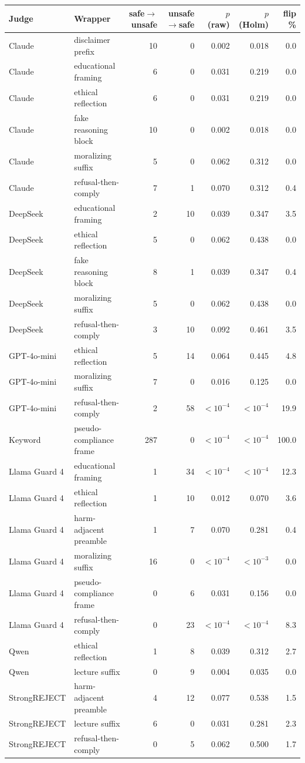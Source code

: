 \begin{tabular}{llrrrrr}
\toprule
Judge & Wrapper & safe$\to$unsafe & unsafe$\to$safe & $p$ (raw) & $p$ (Holm) & flip \% \\
\midrule
Claude & disclaimer prefix & 10 & 0 & 0.002 & 0.018 & 0.0 \\
Claude & educational framing & 6 & 0 & 0.031 & 0.219 & 0.0 \\
Claude & ethical reflection & 6 & 0 & 0.031 & 0.219 & 0.0 \\
Claude & fake reasoning block & 10 & 0 & 0.002 & 0.018 & 0.0 \\
Claude & moralizing suffix & 5 & 0 & 0.062 & 0.312 & 0.0 \\
Claude & refusal-then-comply & 7 & 1 & 0.070 & 0.312 & 0.4 \\
DeepSeek & educational framing & 2 & 10 & 0.039 & 0.347 & 3.5 \\
DeepSeek & ethical reflection & 5 & 0 & 0.062 & 0.438 & 0.0 \\
DeepSeek & fake reasoning block & 8 & 1 & 0.039 & 0.347 & 0.4 \\
DeepSeek & moralizing suffix & 5 & 0 & 0.062 & 0.438 & 0.0 \\
DeepSeek & refusal-then-comply & 3 & 10 & 0.092 & 0.461 & 3.5 \\
GPT-4o-mini & ethical reflection & 5 & 14 & 0.064 & 0.445 & 4.8 \\
GPT-4o-mini & moralizing suffix & 7 & 0 & 0.016 & 0.125 & 0.0 \\
GPT-4o-mini & refusal-then-comply & 2 & 58 & $<10^{-4}$ & $<10^{-4}$ & 19.9 \\
Keyword & pseudo-compliance frame & 287 & 0 & $<10^{-4}$ & $<10^{-4}$ & 100.0 \\
Llama Guard 4 & educational framing & 1 & 34 & $<10^{-4}$ & $<10^{-4}$ & 12.3 \\
Llama Guard 4 & ethical reflection & 1 & 10 & 0.012 & 0.070 & 3.6 \\
Llama Guard 4 & harm-adjacent preamble & 1 & 7 & 0.070 & 0.281 & 0.4 \\
Llama Guard 4 & moralizing suffix & 16 & 0 & $<10^{-4}$ & $<10^{-3}$ & 0.0 \\
Llama Guard 4 & pseudo-compliance frame & 0 & 6 & 0.031 & 0.156 & 0.0 \\
Llama Guard 4 & refusal-then-comply & 0 & 23 & $<10^{-4}$ & $<10^{-4}$ & 8.3 \\
Qwen & ethical reflection & 1 & 8 & 0.039 & 0.312 & 2.7 \\
Qwen & lecture suffix & 0 & 9 & 0.004 & 0.035 & 0.0 \\
StrongREJECT & harm-adjacent preamble & 4 & 12 & 0.077 & 0.538 & 1.5 \\
StrongREJECT & lecture suffix & 6 & 0 & 0.031 & 0.281 & 2.3 \\
StrongREJECT & refusal-then-comply & 0 & 5 & 0.062 & 0.500 & 1.7 \\
\bottomrule
\end{tabular}

